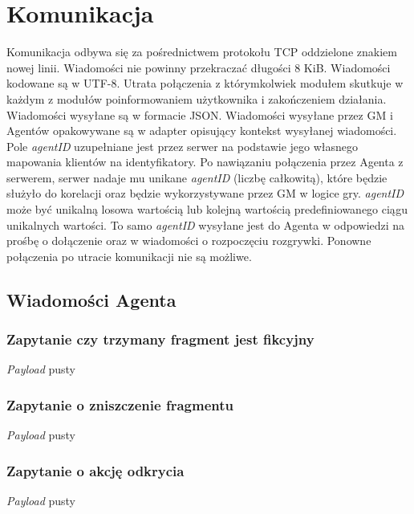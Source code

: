 \documentclass[Dokumentacja.tex]{subfiles}
\begin{document}
\section{Komunikacja}
\label{sec:komunikacja}

Komunikacja odbywa się za pośrednictwem protokołu TCP oddzielone znakiem nowej linii.
Wiadomości nie powinny przekraczać długości 8 KiB. Wiadomości kodowane są w UTF-8.
Utrata połączenia z którymkolwiek modułem skutkuje w każdym z modułów
poinformowaniem użytkownika i zakończeniem działania. Wiadomości wysyłane są w formacie JSON.
Wiadomości wysyłane przez GM i Agentów opakowywane są w adapter opisujący kontekst wysyłanej wiadomości.
Pole \textit{agentID} uzupełniane jest przez serwer na podstawie jego własnego mapowania
klientów na identyfikatory. Po nawiązaniu połączenia przez Agenta z serwerem,
serwer nadaje mu unikane \textit{agentID} (liczbę całkowitą), które będzie służyło do korelacji oraz będzie
wykorzystywane przez GM w logice gry.
\textit{agentID} może być unikalną losowa wartością lub kolejną wartością predefiniowanego ciągu
unikalnych wartości. To samo \textit{agentID}
wysyłane jest do Agenta w odpowiedzi na prośbę o dołączenie
oraz w wiadomości o rozpoczęciu rozgrywki. Ponowne połączenia po utracie komunikacji nie są możliwe.


\subsection{Wiadomości Agenta}
\subsubsection{Zapytanie czy trzymany fragment jest fikcyjny}
\textit{Payload} pusty


\subsubsection{Zapytanie o zniszczenie fragmentu}
\textit{Payload} pusty


\subsubsection{Zapytanie o akcję odkrycia}
\textit{Payload} pusty

\end{document}
